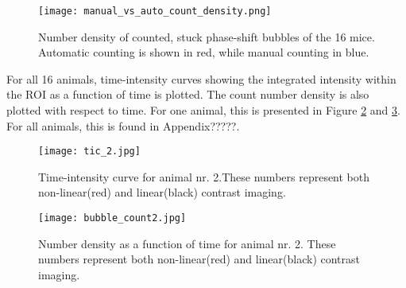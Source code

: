 \begin{figure}[h]
  \centering
  \texttt{[image: manual\_vs\_auto\_count\_density.png]}
  \caption{Number density of counted, stuck phase-shift bubbles of the 16 mice. Automatic counting is shown in red, while manual counting in blue.}
  \label{Fig:Number density of counted bubbles}
\end{figure}

For all 16 animals, time-intensity curves showing the integrated intensity within the ROI as a function of time is plotted. The count number density is also plotted with respect to time. For  one animal, this is presented in Figure \ref{Fig:tic} and \ref{Fig:tic_count}. For all animals, this is found in Appendix?????.


\begin{figure}[h]
  \centering
  \texttt{[image: tic\_2.jpg]}
  \caption{Time-intensity curve for animal nr. 2.These numbers represent both non-linear(red) and linear(black) contrast imaging.}
  \label{Fig:tic}
\end{figure}

\begin{figure}[h]
  \centering
  \texttt{[image: bubble\_count2.jpg]}
  \caption{Number density as a function of time for animal nr. 2. These numbers represent both non-linear(red) and linear(black) contrast imaging.}
  \label{Fig:tic_count}
\end{figure}




